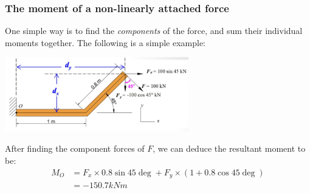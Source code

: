 \subsubsection{The moment of a non-linearly attached force}
One simple way is to find the \emph{components} of the force, and sum their individual moments together. The following is a simple example:
\begin{center}
    \includegraphics[width=8cm]{img/Moment1.jpg}

    After finding the component forces of $F$, we can deduce the resultant moment to be:
    \begin{align*}
        M_O & =F_x\times 0.8\sin 45\deg+F_y\times(1+0.8\cos 45\deg) \\
            & =-150.7kNm
    \end{align*}
\end{center}

